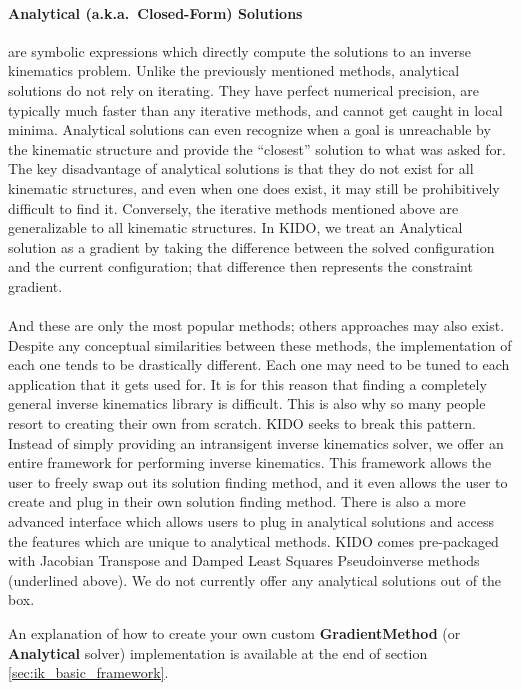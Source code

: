 \paragraph{Analytical (a.k.a.\ Closed-Form) Solutions} are symbolic expressions which directly compute the solutions to an inverse kinematics problem. Unlike the previously mentioned methods, analytical solutions do not rely on iterating. They have perfect numerical precision, are typically much faster than any iterative methods, and cannot get caught in local minima. Analytical solutions can even recognize when a goal is unreachable by the kinematic structure and provide the ``closest'' solution to what was asked for. The key disadvantage of analytical solutions is that they do not exist for all kinematic structures, and even when one does exist, it may still be prohibitively difficult to find it. Conversely, the iterative methods mentioned above are generalizable to all kinematic structures. In KIDO, we treat an Analytical solution as a gradient by taking the difference between the solved configuration and the current configuration; that difference then represents the constraint gradient.

\paragraph{} And these are only the most popular methods; others approaches may also exist. Despite any conceptual similarities between these methods, the implementation of each one tends to be drastically different. Each one may need to be tuned to each application that it gets used for. It is for this reason that finding a completely general inverse kinematics library is difficult. This is also why so many people resort to creating their own from scratch. KIDO seeks to break this pattern. Instead of simply providing an intransigent inverse kinematics solver, we offer an entire framework for performing inverse kinematics. This framework allows the user to freely swap out its solution finding method, and it even allows the user to create and plug in their own solution finding method. There is also a more advanced interface which allows users to plug in analytical solutions and access the features which are unique to analytical methods. KIDO comes pre-packaged with Jacobian Transpose and Damped Least Squares Pseudoinverse methods (underlined above). We do not currently offer any analytical solutions out of the box.

An explanation of how to create your own custom \textbf{GradientMethod} (or \textbf{Analytical} solver) implementation is available at the end of section \ref{sec:ik_basic_framework}.

